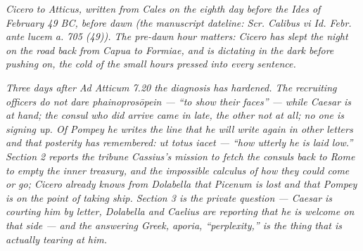 
\textit{Cicero to Atticus, written from Cales on the
eighth day before the Ides of February 49 BC, before
dawn (the manuscript dateline:
\textit{Scr. Calibus vi Id. Febr. ante lucem a. 705
(49)}). The pre-dawn hour matters: Cicero has slept
the night on the road back from Capua to Formiae, and
is dictating in the dark before pushing on, the cold
of the small hours pressed into every sentence.}

\textit{Three days after \emph{Ad Atticum} 7.20 the
diagnosis has hardened. The recruiting officers do
not dare \emph{phainoprosōpein} --- ``to show their
faces'' --- while Caesar is at hand; the consul who
did arrive came in late, the other not at all; no one
is signing up. Of Pompey he writes the line that he
will write again in other letters and that posterity
has remembered: \emph{ut totus iacet} --- ``how
utterly he is laid low.'' Section 2 reports the
tribune Cassius's mission to fetch the consuls back
to Rome to empty the inner treasury, and the impossible
calculus of how they could come or go; Cicero already
knows from Dolabella that Picenum is lost and that
Pompey is on the point of taking ship. Section 3 is
the private question --- Caesar is courting him by
letter, Dolabella and Caelius are reporting that he
is welcome on that side --- and the answering Greek,
\emph{aporia}, ``perplexity,'' is the thing that is
actually tearing at him.}
